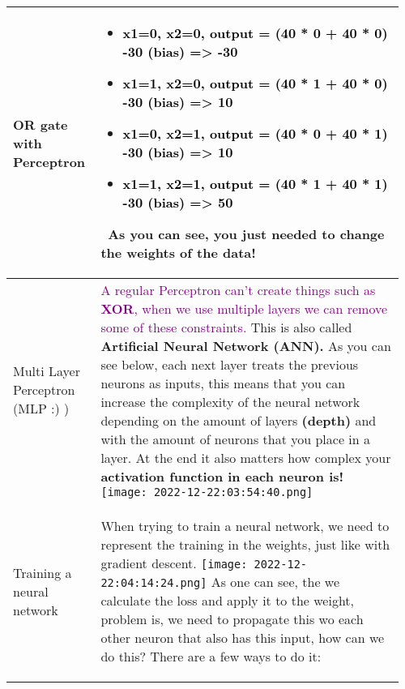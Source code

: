 \documentclass[main.tex,fontsize=8pt,paper=a4,paper=portrait,DIV=calc,]{scrartcl}
\begin{document}
\begin{table}[ht!]
\begin{tabular}{|m{0.2\linewidth}|m{0.755\linewidth}|}
\hline
OR gate with Perceptron & 
\vspace{2mm}
\begin{itemize}
\item \textcolor{black}{x1=0, x2=0, output = (40 * 0 + 40 * 0) -30 (bias) => -30}
\item \textcolor{black}{x1=1, x2=0, output = (40 * 1 + 40 * 0) -30 (bias) => 10}
\item \textcolor{black}{x1=0, x2=1, output = (40 * 0 + 40 * 1) -30 (bias) => 10}
\item \textcolor{black}{x1=1, x2=1, output = (40 * 1 + 40 * 1) -30 (bias) => 50}
  \vspace{-3mm}
\end{itemize} 
\, \newline
As you can see, you just needed to change the weights of the data!
\\
\hline
Multi Layer Perceptron (MLP :) ) & 
\textcolor{purple}{A regular Perceptron can't create things such as \textbf{XOR}, when we use multiple layers we can remove some of these constraints.}\newline
This is also called \textbf{Artificial Neural Network (ANN).}\newline
As you can see below, each next layer treats the previous neurons as inputs, this means that you can increase the complexity of the neural network depending on the amount of layers \textbf{(depth)} and with the amount of neurons that you place in a layer.\newline
At the end it also matters how complex your \textbf{activation function in each neuron is!}\newline
\texttt{[image: 2022-12-22:03:54:40.png]}\\
\hline
Training a neural network & 
When trying to train a neural network, we need to represent the training in the weights, just like with gradient descent.\newline
\texttt{[image: 2022-12-22:04:14:24.png]}\newline
As one can see, the we calculate the loss and apply it to the weight, problem is, we need to propagate this wo each other neuron that also has this input, how can we do this?\newline
There are a few ways to do it:\newline
\begin{itemize}

\end{itemize}
\end{tabular}
\end{table}
\end{document}
